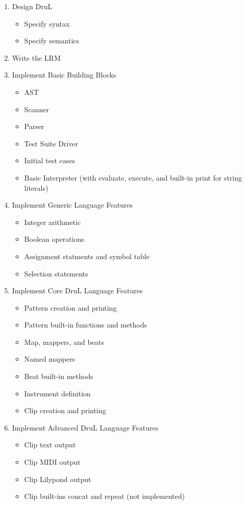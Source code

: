 \begin{enumerate}

\item Design DruL
\begin{itemize}
	\item Specify syntax
	\item Specify semantics
\end{itemize}

\item Write the LRM

\item Implement Basic Building Blocks
\begin{itemize}
	\item AST
	\item Scanner
	\item Parser
	\item Test Suite Driver
	\item Initial test cases
	\item Basic Interpreter (with evaluate, execute, and built-in print for string literals)
\end{itemize}

\item Implement Generic Language Features
\begin{itemize}
	\item Integer arithmetic
	\item Boolean operations
	\item Assignment statments and symbol table
	\item Selection statements
\end{itemize}

\item Implement Core DruL Language Features
\begin{itemize}
	\item Pattern creation and printing
	\item Pattern built-in functions and methods
	\item Map, mappers, and beats
	\item Named mappers
	\item Beat built-in methods
	\item Instrument definition
	\item Clip creation and printing
\end{itemize}

\item Implement Advanced DruL Language Features
\begin{itemize}
	\item Clip text output
	\item Clip MIDI output
	\item Clip Lilypond output
	\item Clip built-ins concat and repeat (not implemented)
\end{itemize}


\end{enumerate}
